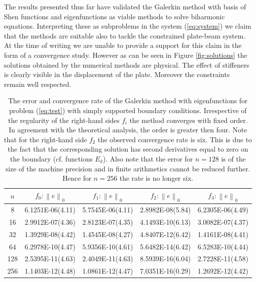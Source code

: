 \documentclass{marine_2015}
\newcommand{\norm}[1]{\ensuremath{\left\|#1\right\|}}
\begin{document}
  The results presented thus far have validated the Galerkin method with basis
  of Shen functions and eigenfunctions as viable methods to solve biharmonic
  equations. Interpreting these as subproblems in the system (\ref{eq:system}) we
  claim that the methods are suitable also to tackle the constrained plate-beam system.
  At the time of writing we are unable to provide a support for this claim in
  the form of a convergence study. However as can be seen in Figure \ref{fig:solutions} 
  the solutions obtained by the numerical methods are physical. The effect of
  stiffeners is clearly visible in the displacement of the plate. Moreover the 
  constraints remain well respected.
\begin{table}[t!]
    \begin{center}
    \begin{tabular}{ccccc}
\hline
$n$  &  $f_0: \norm{e}_0$  & $f_1: \norm{e}_0$ & $f_2: \norm{e}_0$ & $f_3: \norm{e}_0$\\
\hline
8    & 6.1251E-06(4.11) & 5.7545E-06(4.11) & 2.8982E-08(5.84)& 6.2305E-06(4.49) \\
16   & 2.9912E-07(4.36) & 2.8123E-07(4.35) & 4.1493E-10(6.13)& 3.0082E-07(4.37) \\
32   & 1.3929E-08(4.42) & 1.4545E-08(4.27) & 4.8407E-12(6.42)& 1.4161E-08(4.41) \\
64   & 6.2978E-10(4.47) & 5.9356E-10(4.61) & 5.6482E-14(6.42)& 6.5283E-10(4.44) \\
128  & 2.5395E-11(4.63) & 2.4049E-11(4.63) & 8.5939E-16(6.04)& 2.7228E-11(4.58) \\
256  & 1.1403E-12(4.48) & 1.0861E-12(4.47) & 7.0351E-16(0.29)& 1.2692E-12(4.42) \\
\hline
\hline
    \end{tabular}
    \caption{The error and convergence rate of the Galerkin method with eigenfunctions for
    problem (\ref{eq:test}) with simply supported boundary conditions.
Irrespective of the regularity of the right-hand sides $f_i$ the method
converges with fixed order. In agreement with the theoretical analysis, the
order is greater then four. Note that for the right-hand side $f_2$ the observed 
convergence rate is six. This is due to the fact that the corresponding solution 
has second derivatives equal to zero on the boundary (cf. functions $E_k$). Also 
note that the error for $n=128$ is of the size of the machine precision and in
finite arithmetics cannot be reduced further. Hence for $n=256$ the rate is no
longer six.}
  \label{tab:sine_convergence}
  \end{center}
  \end{table}
\end{document}
